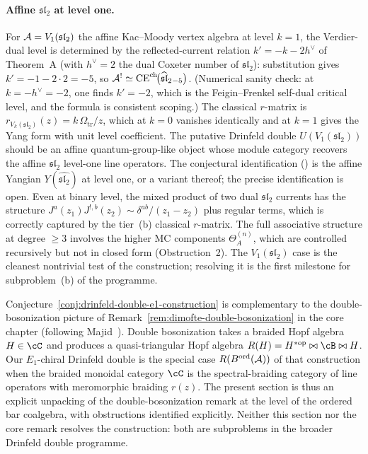 \paragraph{Affine $\mathfrak{sl}_2$ at level one.}
For $\mathcal{A} = V_1(\mathfrak{sl}_2)$ the affine Kac--Moody
vertex algebra at level $k=1$, the Verdier-dual level is
determined by the reflected-current relation $k' = -k - 2h^\vee$
of Theorem~A (with $h^\vee = 2$ the dual Coxeter number of
$\mathfrak{sl}_2$): substitution gives
$k' = -1 - 2\cdot 2 = -5$, so
$\mathcal{A}^! \simeq
\operatorname{CE}^{\mathrm{ch}}\!\bigl(\widehat{\mathfrak{sl}}_2{}_{-5}\bigr)$.
(Numerical sanity
check: at $k = -h^\vee = -2$, one finds $k' = -2$, which
is the Feigin--Frenkel self-dual critical level, and the
formula is consistent scoping.) The classical
$r$-matrix is
$r_{V_k(\mathfrak{sl}_2)}(z) = k\,\Omega_{\mathrm{tr}}/z$, which at
$k=0$ vanishes identically and at $k=1$
gives the Yang form with unit level coefficient. The putative
Drinfeld double
$U(V_1(\mathfrak{sl}_2))$ should be an affine
quantum-group-like object whose module category
recovers the affine $\mathfrak{sl}_2$ level-one line
operators. The conjectural identification (\ClaimStatusConjectured)
is the affine Yangian $Y(\widehat{\mathfrak{sl}_2})$ at level one,
or a variant thereof; the precise identification is open.
Even at binary level, the mixed product of two dual
$\mathfrak{sl}_2$ currents has the structure
$J^a(z_1)J^{!,b}(z_2) \sim \delta^{ab}/(z_1-z_2)$ plus
regular terms, which is correctly captured by
the tier~(b) classical $r$-matrix. The full
associative structure at degree $\ge 3$ involves the
higher MC components $\Theta_A^{(n)}$, which are
controlled recursively but not in closed form
(Obstruction~2). The $V_1(\mathfrak{sl}_2)$ case is
the cleanest nontrivial test of the construction;
resolving it is the first milestone for subproblem~(b)
of the programme.

\begin{remark}
\label{rem:drinfeld-e1-dimofte}
Conjecture~\ref{conj:drinfeld-double-e1-construction} is
complementary to the double-bosonization picture of
Remark~\ref{rem:dimofte-double-bosonization} in the core
chapter (following Majid~\cite{Majid95}). Double
bosonization takes a braided Hopf algebra $H\in\cC$ and
produces a quasi-triangular Hopf algebra
$R(H) = H^{*\mathrm{op}}\bowtie \cB\bowtie H$. Our
$E_1$-chiral Drinfeld double is the special case
$R(B^{\mathrm{ord}}(\mathcal{A}))$ of that construction when the
braided monoidal category $\cC$ is the spectral-braiding
category of line operators with meromorphic braiding
$r(z)$. The present section is thus an explicit
unpacking of the double-bosonization remark at the level
of the ordered bar coalgebra, with obstructions
identified explicitly. Neither this section nor the
core remark resolves the construction: both are
subproblems in the broader Drinfeld double programme.
\end{remark}

